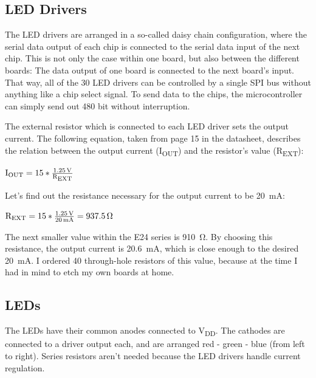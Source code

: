 \documentclass[a4paper, 11pt, titlepage]{report}
\def \vdd {V\textsubscript{DD}}
\newenvironment{ownmath}
{\vspace{2mm}\hspace{15pt}\begin{math}}
{\end{math}\vspace{2mm}}
\begin{document}
\subsection{LED Drivers}

The LED drivers are arranged in a so-called daisy chain configuration, where the serial data output
of each chip is connected to the serial data input of the next chip. This is not only the case
within one board, but also between the different boards: The data output of one board is connected
to the next board's input. That way, all of the 30 LED drivers can be controlled by a single SPI
bus without anything like a chip select signal. To send data to the chips, the microcontroller
can simply send out 480 bit without interruption.

\def \iout {I\textsubscript{OUT}}
\def \rext {R\textsubscript{EXT}}

The external resistor which is connected to each LED driver sets the output
current. The following equation, taken from page 15 in the datasheet, describes the relation
between the output current (\iout) and the resistor's value (\rext):

\begin{ownmath}
\textrm{\iout} = 15 * \frac{\SI{1.25}{\volt}}{\si{\rext}}
\end{ownmath}

Let's find out the resistance necessary for the output current to be \SI{20}{\milli\ampere}:

\begin{ownmath}
\textrm{\rext} = 15 * \frac{\SI{1.25}{\volt}}{\SI{20}{\milli\ampere}} = \SI{937.5}{\ohm}
\end{ownmath}

The next smaller value within the E24 series is \SI{910}{\ohm}. By choosing this resistance, the
output current is \SI{20.6}{\milli\ampere}, which is close enough to the desired
\SI{20}{\milli\ampere}. I ordered 40 through-hole resistors of this value, because at the time I
had in mind to etch my own boards at home.


\subsection{LEDs}

The LEDs have their common anodes connected to \vdd. The cathodes are connected to a driver output
each, and are arranged red - green - blue (from left to right). Series resistors aren't needed
because the LED drivers handle current regulation.
\end{document}
